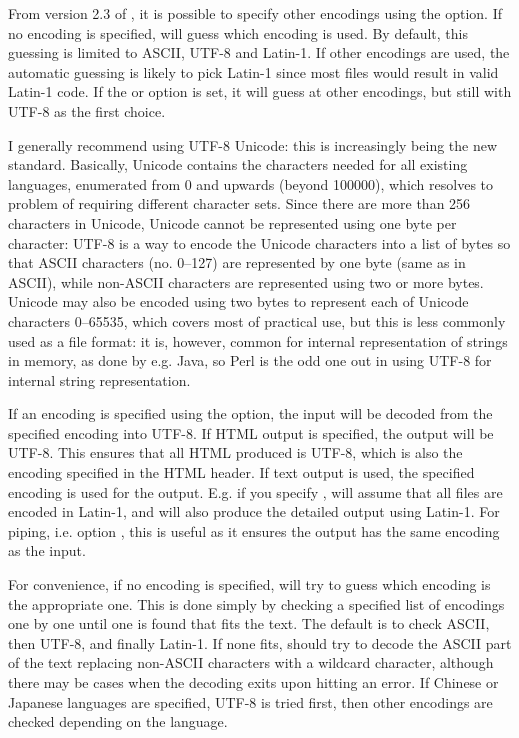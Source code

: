 \documentclass{article}
\begin{document}
From version 2.3 of \TeXcount{}, it is possible to specify other encodings using the  option. If no encoding is specified, \TeXcount{} will guess which encoding is used. By default, this guessing is limited to ASCII, UTF-8 and Latin-1. If other encodings are used, the automatic guessing is likely to pick Latin-1 since most files would result in valid Latin-1 code. If the  or  option is set, it will guess at other encodings, but still with UTF-8 as the first choice.

I generally recommend using UTF-8 Unicode: this is increasingly being the new standard. Basically, Unicode contains the characters needed for all existing languages, enumerated from 0 and upwards (beyond 100000), which resolves to problem of requiring different character sets. Since there are more than 256 characters in Unicode, Unicode cannot be represented using one byte per character: UTF-8 is a way to encode the Unicode characters into a list of bytes so that ASCII characters (no. 0--127) are represented by one byte (same as in ASCII), while non-ASCII characters are represented using two or more bytes. Unicode may also be encoded using two bytes to represent each of Unicode characters 0--65535, which covers most of practical use, but this is less commonly used as a file format: it is, however, common for internal representation of strings in memory, as done by e.g. Java, so Perl is the odd one out in using UTF-8 for internal string representation.

If an encoding is specified using the  option, the input will be decoded from the specified encoding into UTF-8. If HTML output is specified, the output will be UTF-8. This ensures that all HTML produced is UTF-8, which is also the encoding specified in the HTML header. If text output is used, the specified encoding is used for the output. E.g. if you specify , \TeXcount{} will assume that all files are encoded in Latin-1, and will also produce the detailed output using Latin-1. For piping, i.e. option \code{-}, this is useful as it ensures the output has the same encoding as the input.

For convenience, if no encoding is specified, \TeXcount{} will try to guess which encoding is the appropriate one. This is done simply by checking a specified list of encodings one by one until one is found that fits the text. The default is to check ASCII, then UTF-8, and finally Latin-1. If none fits, \TeXcount{} should try to decode the ASCII part of the text replacing non-ASCII characters with a wildcard character, although there may be cases when the decoding exits upon hitting an error. If Chinese or Japanese languages are specified, UTF-8 is tried first, then other encodings are checked depending on the language.
\end{document}
